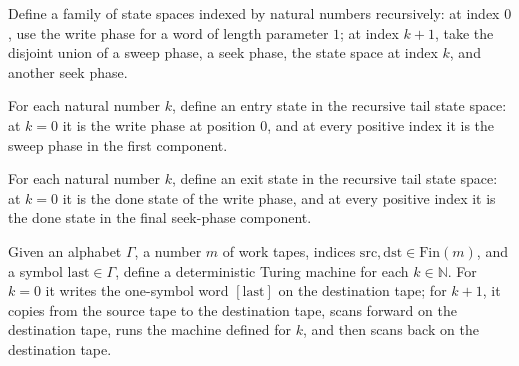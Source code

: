 \begin{definition}
\label{Turing.rt_tailState}
\leanok
{}
Define a family of state spaces indexed by natural numbers recursively: at index $0$,
use the write phase for a word of length parameter $1$; at index $k+1$, take the
disjoint union of a sweep phase, a seek phase, the state space at index $k$, and another
seek phase.
\end{definition}

\begin{definition}
\label{Turing.rt_tailEntry}
\leanok
{}
For each natural number $k$, define an entry state in the recursive tail state space: at
$k=0$ it is the write phase at position $0$, and at every positive index it is the sweep
phase in the first component.
\end{definition}

\begin{definition}
\label{Turing.rt_tailExit}
\leanok
{}
For each natural number $k$, define an exit state in the recursive tail state space: at
$k=0$ it is the done state of the write phase, and at every positive index it is the
done state in the final seek-phase component.
\end{definition}

\begin{definition}
\label{Turing.rt_tailTM}
\leanok
{}
Given an alphabet $\Gamma$, a number $m$ of work tapes, indices
$\mathrm{src},\mathrm{dst}\in\mathrm{Fin}(m)$, and a symbol $\mathrm{last}\in\Gamma$,
define a deterministic Turing machine for each $k\in\mathbb N$. For $k=0$ it writes the
one-symbol word $[\mathrm{last}]$ on the destination tape; for $k+1$, it copies from the
source tape to the destination tape, scans forward on the destination tape, runs the
machine defined for $k$, and then scans back on the destination tape.
\end{definition}

